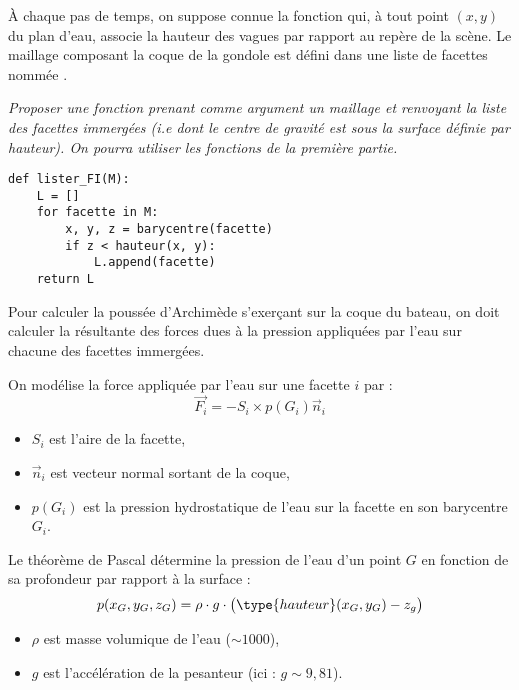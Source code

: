 À chaque pas de temps, on suppose connue la fonction  qui, à tout point $(x,y)$ du plan d’eau, associe la hauteur des vagues par rapport au repère de la scène. Le maillage composant la coque de la gondole est défini dans une liste de facettes nommée .
\begin{Exercise}\it 
 Proposer une fonction  prenant comme argument un maillage  et renvoyant la liste des facettes immergées (i.e dont le centre de gravité est sous la surface définie par hauteur). On pourra utiliser les fonctions de la première partie.
\end{Exercise}
\begin{Answer}
\begin{lstlisting}
def lister_FI(M):
    L = []
    for facette in M:
        x, y, z = barycentre(facette)
        if z < hauteur(x, y):
            L.append(facette)
    return L
\end{lstlisting}
\end{Answer}

\medskip

Pour calculer la poussée d’Archimède s’exerçant sur la coque du bateau, on doit calculer la résultante des forces dues à la pression appliquées par l’eau sur chacune des facettes immergées.

On modélise la force appliquée par l’eau sur une facette $i$ par :
\[\overrightarrow{F_i} = - S_i\times p(G_i)\vec n_i\]

\begin{itemize}
    \item $S_i$ est l'aire de la facette,
    \item $\vec n_i$ est vecteur normal sortant de la coque,
    \item $p(G_i)$ est la pression hydrostatique de l’eau sur la facette en son barycentre $G_i$.
\end{itemize}

Le théorème de Pascal détermine la pression de l’eau d’un point $G$ en fonction de sa profondeur par rapport à la surface :
\[p(x_G ,y_G ,z_G) = \rho \cdot g \cdot \bigl( \type{hauteur}(x_G ,y_G) - z_g\bigr)\]
\begin{itemize}
    \item $\rho$ est masse volumique de l’eau ($\sim 1000$),
    \item $g$ est l'accélération de la pesanteur (ici : $g \sim 9,81$).
\end{itemize}

